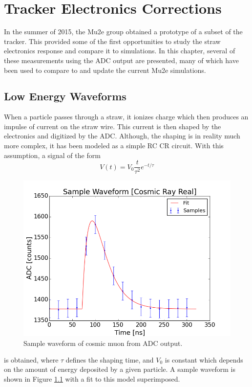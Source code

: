 %
%
\chapter{Tracker Electronics Corrections}\label{ch:trackerelectronics}

In the summer of 2015, the Mu2e group obtained a prototype of a subset of the tracker. This provided some of the first opportunities to study the straw electronics response and compare it to simulations. In this chapter, several of these measurements using the ADC output are presented, many of which have been used to compare to and update the current Mu2e simulations.

\section{Low Energy Waveforms}

When a particle passes through a straw, it ionizes charge which then produces an impulse of current on the straw wire. This current is then shaped by the electronics and digitized by the ADC. Although, the shaping is in reality much more complex, it has been modeled as a simple RC CR circuit. With this assumption, a signal of the form 
\begin{equation}
	V(t) = V_0 \frac{t}{\tau^2} e^{-t / \tau}
	\label{eq:base1}
\end{equation}
\begin{figure}[htp!]
    \centering
    \includegraphics[scale=0.5]{Images2/sampleWaveformCosmic.png}
    \caption{Sample waveform of cosmic muon from ADC output.}
    \label{fig:sampleCosmic}
\end{figure} 
is obtained, where $\tau$ defines the shaping time, and $V_0$ is constant which depends on the amount of energy deposited by a given particle. A sample waveform is shown in Figure \ref{fig:sampleCosmic} with a fit to this model superimposed. 

